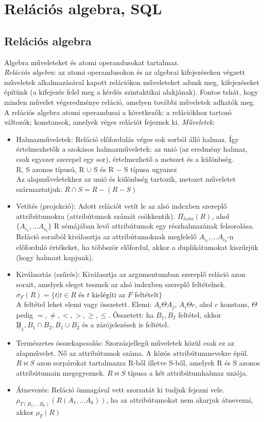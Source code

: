 \documentclass[margin=0px]{article}
\begin{document}
	\section{Relációs algebra, SQL}
	
	\subsection{Relációs algebra}
	
	Algebra műveleteket és atomi operandusokat tartalmaz. \\
	\textit{Relációs algebra}: az atomi operandusokon és az algebrai kifejezéseken végzett műveletek alkalmazásával kapott relációkon műveleteket adunk meg, kifejezéseket építünk (a kifejezés felel meg a kérdés szintaktikai alakjának). Fontos tehát, hogy minden művelet végeredménye reláció, amelyen további műveletek adhatók meg. A relációs algebra atomi operandusai a következők: a relációkhoz tartozó változók; konstansok, amelyek véges relációt fejeznek ki.
	\textit{Műveletek}:
	\begin{itemize}
		\item Halmazműveletek: Reláció előfordulás véges sok sorból álló halmaz. Így értelmezhetők a szokásos halmazműveletek: az unió (az eredmény halmaz, csak egyszer szerepel egy sor), értelmezhető a metszet és a különbség. \\
		R, S azonos típusú, R $\cup$ S és R $-$ S típusa ugyanez \\
		Az alapműveletekhez az unió és különbség tartozik, metszet műveletet származtatjuk: $R \cap S = R - (R - S)$
		\item Vetítés (projekció): Adott relációt vetít le az alsó indexben szereplő attribútumokra (attribútumok számát csökkentik). $\Pi_{lista}(R)$, ahol $\{A_{i_1},...A_{i_k}\}$ R sémájában levő attribútumok egy részhalmazának felsorolása. Reláció soraiból kiválasztja az attribútumoknak megfelelő $A_{i_1},...A_{i_k}$-n előforduló értékeket, ha többször előfordul, akkor a duplikátumokat kiszűrjük (hogy halmazt kapjunk).
		\item Kiválasztás (szűrés): Kiválasztja az argumentumban szereplő reláció azon sorait, amelyek eleget tesznek az alsó indexben szereplő feltételnek. $\sigma_F(R) = \{t|t \in R$ és $t$ kielégíti az $F$ feltételt$\}$ \\
		A feltétel lehet elemi vagy összetett. Elemi: $A_i \Theta A_j$, $A_i \Theta c$, ahol $c$ konstans, $\Theta$ pedig $=, \neq, <, >, \geq, \leq$. Összetett: ha $B_1, B_2$ feltétel, akkor $\not B_1, B_1 \cap B_2, B_1 \cup B_2$ és a zárójelezések is feltétel.
		\item Természetes összekapcsolás: Szorzásjellegű műveletek közül csak ez az alapművelet. Nő az attribútumok száma. A közös attribútumnevekre épül. $R \bowtie S$ azon sorpárokat tartalmazza R-ből illetve S-ből, amelyek R és S azonos attribútumain megegyeznek. $R \bowtie S$ típusa a két attribútumhalmaz uniója.
		\item Átnevezés: Reláció önmagával vett szorzatát ki tudjuk fejezni vele. $\rho_{T(B_1,...B_k)}(R(A_1,...A_k))$, ha az attribútumokat nem akarjuk átnevezni, akkor $\rho_{T}(R)$
	\end{itemize}
\end{document}
